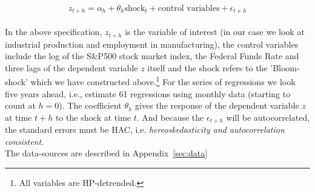 \documentclass[a4paper,12pt,oneside,pointednumbers,bibtotoc,bigheadings,liststotoc]{scrbook}
\begin{document}
\begin{equation} \label{eq:2.1}
z_{t+h} = \alpha_h + \theta_h \text{shock}_t + \text{control variables} + \epsilon_{t+h}
\end{equation}\\

In the above specification, $z_{t+h}$ is the variable of interest (in our case we look at industrial production and employment in manufacturing), the control variables include the log of the S\&P500 stock market index, the Federal Funds Rate and three lags of the dependent variable $z$ itself and the shock refers to the 'Bloom-shock' which we have constructed above.\footnote{All variables are HP-detrended.} For the series of regressions we look five years ahead, i.e., estimate 61 regressions using monthly data (starting to count at $h=0$). The coefficient $\theta_h$ gives the response of the dependent variable $z$ at time $t+h$ to the shock at time $t$. And because the $\epsilon_{t+h}$ will be autocorrelated, the standard errors must be HAC, i.e. \textit{hereoskedasticity and autocorrelation consistent}.\\
The data-sources are described in Appendix~\ref{sec:data}
\end{document}

